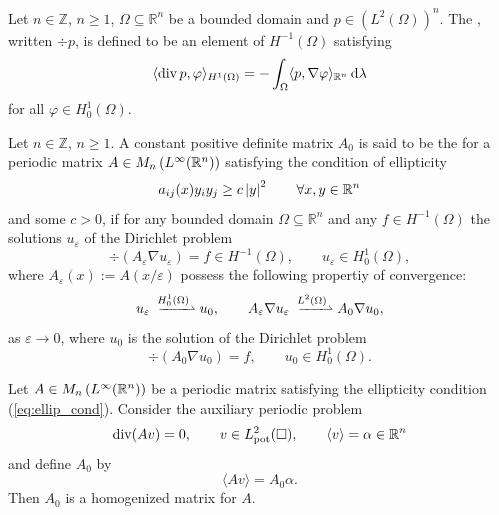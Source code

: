 \begin{definition}
Let $n \in \mathbb{Z}$, $n \geq 1$, $\Omega \subseteq \mathbb{R}^n$ be a bounded domain and $p \in (L^2(\Omega))^n$. The , written $\div p$, is defined to be an element of $H^{-1}(\Omega)$ satisfying
\begin{equation}
\langle \operatorname{div} p, \varphi \rangle_{H^1(\Omega)} = - \int_\Omega \langle p, \nabla \varphi \rangle_{\mathbb{R}^n} \mathop{}\!\mathrm{d} \lambda
\end{equation}
\noindent for all $\varphi \in H^1_0(\Omega)$.
\end{definition}

\begin{definition}
Let $n \in \mathbb{Z}$, $n \geq 1$. A constant positive definite matrix $A_0$ is said to be the  for a periodic matrix $A \in M_n\del[0]{L^\infty(\mathbb{R}^n)}$ satisfying the condition of ellipticity
\begin{equation}
a_{ij}(x)y_iy_j \geq c\abs[0]{y}^2 \qquad \forall x,y \in \mathbb{R}^n
\label{eq:ellip_cond}
\end{equation}
\noindent and some $c > 0$, if for any bounded domain $\Omega \subseteq \mathbb{R}^n$ and any $f \in H^{-1}(\Omega)$ the solutions $u_\varepsilon$ of the Dirichlet problem 
\begin{equation}
\div(A_\varepsilon \nabla u_\varepsilon) = f \in H^{-1}(\Omega), \qquad u_\varepsilon \in H^1_0(\Omega),
\end{equation}
\noindent where $A_\varepsilon(x) := A(x/\varepsilon)$ possess the following propertiy of convergence:
\begin{equation}
u_\varepsilon \xrightharpoonup[]{H^1_0(\Omega)} u_0, \qquad A_\varepsilon \nabla u_\varepsilon \xrightharpoonup[]{L^2(\Omega)} A_0\nabla u_0,
\end{equation}
\noindent as $\varepsilon \to 0$, where $u_0$ is the solution of the Dirichlet problem
\begin{equation}
\div(A_0 \nabla u_0) = f, \qquad u_0\in H^1_0(\Omega).
\end{equation}
\end{definition}

\begin{theorem}
Let $A \in M_n\del[0]{L^\infty(\mathbb{R}^n)}$ be a periodic matrix satisfying the ellipticity condition \textup{(}\ref{eq:ellip_cond}\textup{)}. Consider the auxiliary periodic problem
\begin{equation}
\operatorname{div}(Av) = 0, \qquad v \in L^2_{\mathrm{pot}}(\Box), \qquad \langle v \rangle = \alpha \in \mathbb{R}^n
\end{equation} 
\noindent and define $A_0$ by
\begin{equation}
\langle Av \rangle = A_0 \alpha.
\end{equation}
Then $A_0$ is a homogenized matrix for $A$.
\label{thm:homogenized}
\end{theorem}


